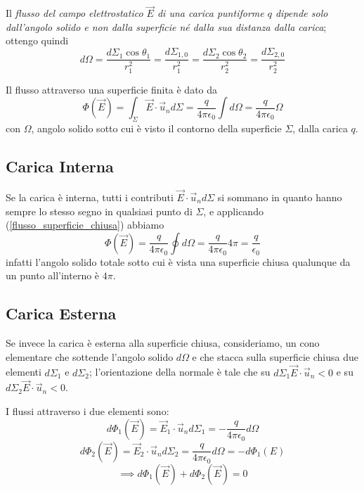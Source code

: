 \documentclass[class=book, crop=false, oneside, 12pt]{standalone}
\begin{document}
Il \emph{flusso del campo elettrostatico \(\overrightarrow{E}\) di una carica puntiforme \(q\) dipende solo dall'angolo solido e non dalla superficie né dalla sua distanza dalla carica}; ottengo quindi
\begin{equation*}
    d \Omega = \frac{d \Sigma_1 \cos \theta_1}{r_1^2} = \frac{d \Sigma_{1,0}}{r_1^2} = \frac{d \Sigma_2 \cos \theta_2}{r_2^2} = \frac{d \Sigma_{2,0}}{r_2^2}
\end{equation*}

Il flusso attraverso una superficie finita è dato da
\begin{equation} \label{flusso_superficie_finita}
    \Phi (\overrightarrow{E}) = \int_{\Sigma} \overrightarrow{E} \cdot \overrightarrow{u}_n d \Sigma = \frac{q}{4 \pi \epsilon_0} \int d \Omega = \frac{q}{4 \pi \epsilon_0} \Omega 
\end{equation}
con \(\Omega\), angolo solido sotto cui è visto il contorno della superficie \(\Sigma\), dalla carica \(q\).

\subsection{Carica Interna}
Se la carica è interna, tutti i contributi \(\overrightarrow{E} \cdot \overrightarrow{u}_n d \Sigma\) si sommano in quanto hanno sempre lo stesso segno in qualsiasi punto di \(\Sigma\), e applicando (\ref{flusso_superficie_chiusa}) abbiamo
\begin{equation} \label{flusso_carica_interna}
    \Phi (\overrightarrow{E}) = \frac{q}{4 \pi \epsilon_0} \oint d \Omega = \frac{q}{4 \pi \epsilon_0} 4 \pi = \frac{q}{\epsilon_0}
\end{equation}
infatti l'angolo solido totale sotto cui è vista una superficie chiusa qualunque da un punto all'interno è \(4 \pi\).

\subsection{Carica Esterna}

Se invece la carica è esterna alla superficie chiusa, consideriamo, un cono elementare che sottende l'angolo solido \(d \Omega\) e che stacca sulla superficie chiusa due elementi \(d \Sigma_1\) e \(d \Sigma_2\);
l'orientazione della normale è tale che su \(d \Sigma_1 \overrightarrow{E} \cdot \overrightarrow{u}_n <0 \) e su \(d \Sigma_2 \overrightarrow{E} \cdot \overrightarrow{u}_n <0\). 

I flussi attraverso i due elementi sono: 
\begin{equation*}
    d \Phi_1 (\overrightarrow{E}) = \overrightarrow{E}_1 \cdot \overrightarrow{u}_n d \Sigma_1 = - \frac{q}{4 \pi \epsilon_0} d \Omega
\end{equation*}
\begin{equation*}
    d \Phi_2 (\overrightarrow{E}) = \overrightarrow{E}_2 \cdot \overrightarrow{u}_n d \Sigma_2 = \frac{q}{4 \pi \epsilon_0} d \Omega = - d \Phi_1 (E)
\end{equation*}
\begin{equation*}
    \implies d \Phi_1 (\overrightarrow{E}) + d \Phi_2 (\overrightarrow{E}) = 0
\end{equation*}
\end{document}
